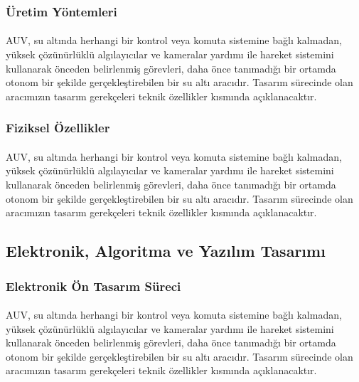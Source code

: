 \documentclass[12pt]{article}
\begin{document}
\subsubsection{Üretim Yöntemleri}

\begin{justify}
\paragraph{} AUV, su altında herhangi bir kontrol veya komuta sistemine bağlı kalmadan, yüksek çözünürlüklü algılayıcılar ve kameralar yardımı ile hareket sistemini kullanarak önceden belirlenmiş görevleri, daha önce tanımadığı bir ortamda otonom bir şekilde gerçekleştirebilen bir su altı aracıdır. Tasarım sürecinde olan aracımızın tasarım gerekçeleri teknik özellikler kısmında açıklanacaktır.
\end{justify}

\subsubsection{Fiziksel Özellikler}

\begin{justify}
\paragraph{} AUV, su altında herhangi bir kontrol veya komuta sistemine bağlı kalmadan, yüksek çözünürlüklü algılayıcılar ve kameralar yardımı ile hareket sistemini kullanarak önceden belirlenmiş görevleri, daha önce tanımadığı bir ortamda otonom bir şekilde gerçekleştirebilen bir su altı aracıdır. Tasarım sürecinde olan aracımızın tasarım gerekçeleri teknik özellikler kısmında açıklanacaktır.
\end{justify}

\subsection{Elektronik, Algoritma ve Yazılım Tasarımı}

\subsubsection{Elektronik Ön Tasarım Süreci}

\begin{justify}
\paragraph{} AUV, su altında herhangi bir kontrol veya komuta sistemine bağlı kalmadan, yüksek çözünürlüklü algılayıcılar ve kameralar yardımı ile hareket sistemini kullanarak önceden belirlenmiş görevleri, daha önce tanımadığı bir ortamda otonom bir şekilde gerçekleştirebilen bir su altı aracıdır. Tasarım sürecinde olan aracımızın tasarım gerekçeleri teknik özellikler kısmında açıklanacaktır.
\end{justify}
\end{document}
